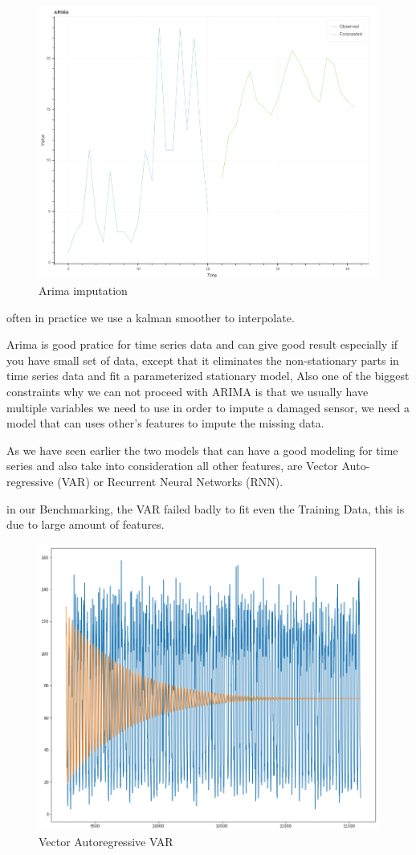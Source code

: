 \begin{figure}[H]
\centering
\includegraphics[scale=.2]{img/arima_imputation.png} 
\caption{Arima imputation}
\label{fig:arima_degree}
\end{figure}
often  in practice we use a kalman smoother to interpolate. 

Arima is good pratice for time series data and can give good result especially if you have small set of data, except that it eliminates the non-stationary parts in time series data and fit a parameterized stationary model, Also one of the biggest constraints why we can not proceed with ARIMA  is that we usually have multiple variables we need to use in order to impute  a damaged sensor, we need a model that can uses other's features to impute the missing data. 

As we have seen earlier the two models that can have a good modeling for time series and also  take into consideration all other features, are  Vector Auto-regressive (VAR) or Recurrent Neural Networks (RNN).

in  our Benchmarking, the VAR failed badly to fit even the Training Data, this is due to large amount of features. 

\begin{figure}[H]
\centering
\includegraphics[width=.5\textwidth]{img/VAR.png} 
\caption{Vector Autoregressive VAR}
\label{fig:arima_degree}
\end{figure}

